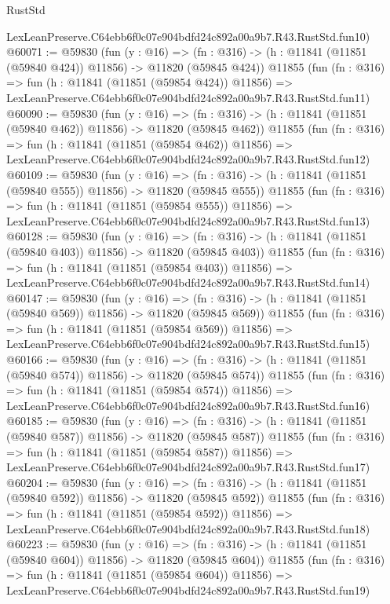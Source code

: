 \begin{lexlean}{RustStd}
\begin{coremodule}
    LexLeanPreserve.C64ebb6f0c07e904bdfd24c892a00a9b7.R43.RustStd.fun10)
@60071 := @59830
    (fun (y : @16) =>
    (fn : @316) -> (h : @11841 (@11851 (@59840 @424)) @11856) -> @11820 (@59845 @424))
    @11855
    (fun (fn : @316) =>
    fun (h : @11841 (@11851 (@59854 @424)) @11856) =>
    LexLeanPreserve.C64ebb6f0c07e904bdfd24c892a00a9b7.R43.RustStd.fun11)
@60090 := @59830
    (fun (y : @16) =>
    (fn : @316) -> (h : @11841 (@11851 (@59840 @462)) @11856) -> @11820 (@59845 @462))
    @11855
    (fun (fn : @316) =>
    fun (h : @11841 (@11851 (@59854 @462)) @11856) =>
    LexLeanPreserve.C64ebb6f0c07e904bdfd24c892a00a9b7.R43.RustStd.fun12)
@60109 := @59830
    (fun (y : @16) =>
    (fn : @316) -> (h : @11841 (@11851 (@59840 @555)) @11856) -> @11820 (@59845 @555))
    @11855
    (fun (fn : @316) =>
    fun (h : @11841 (@11851 (@59854 @555)) @11856) =>
    LexLeanPreserve.C64ebb6f0c07e904bdfd24c892a00a9b7.R43.RustStd.fun13)
@60128 := @59830
    (fun (y : @16) =>
    (fn : @316) -> (h : @11841 (@11851 (@59840 @403)) @11856) -> @11820 (@59845 @403))
    @11855
    (fun (fn : @316) =>
    fun (h : @11841 (@11851 (@59854 @403)) @11856) =>
    LexLeanPreserve.C64ebb6f0c07e904bdfd24c892a00a9b7.R43.RustStd.fun14)
@60147 := @59830
    (fun (y : @16) =>
    (fn : @316) -> (h : @11841 (@11851 (@59840 @569)) @11856) -> @11820 (@59845 @569))
    @11855
    (fun (fn : @316) =>
    fun (h : @11841 (@11851 (@59854 @569)) @11856) =>
    LexLeanPreserve.C64ebb6f0c07e904bdfd24c892a00a9b7.R43.RustStd.fun15)
@60166 := @59830
    (fun (y : @16) =>
    (fn : @316) -> (h : @11841 (@11851 (@59840 @574)) @11856) -> @11820 (@59845 @574))
    @11855
    (fun (fn : @316) =>
    fun (h : @11841 (@11851 (@59854 @574)) @11856) =>
    LexLeanPreserve.C64ebb6f0c07e904bdfd24c892a00a9b7.R43.RustStd.fun16)
@60185 := @59830
    (fun (y : @16) =>
    (fn : @316) -> (h : @11841 (@11851 (@59840 @587)) @11856) -> @11820 (@59845 @587))
    @11855
    (fun (fn : @316) =>
    fun (h : @11841 (@11851 (@59854 @587)) @11856) =>
    LexLeanPreserve.C64ebb6f0c07e904bdfd24c892a00a9b7.R43.RustStd.fun17)
@60204 := @59830
    (fun (y : @16) =>
    (fn : @316) -> (h : @11841 (@11851 (@59840 @592)) @11856) -> @11820 (@59845 @592))
    @11855
    (fun (fn : @316) =>
    fun (h : @11841 (@11851 (@59854 @592)) @11856) =>
    LexLeanPreserve.C64ebb6f0c07e904bdfd24c892a00a9b7.R43.RustStd.fun18)
@60223 := @59830
    (fun (y : @16) =>
    (fn : @316) -> (h : @11841 (@11851 (@59840 @604)) @11856) -> @11820 (@59845 @604))
    @11855
    (fun (fn : @316) =>
    fun (h : @11841 (@11851 (@59854 @604)) @11856) =>
    LexLeanPreserve.C64ebb6f0c07e904bdfd24c892a00a9b7.R43.RustStd.fun19)

\end{coremodule}
\end{lexlean}
